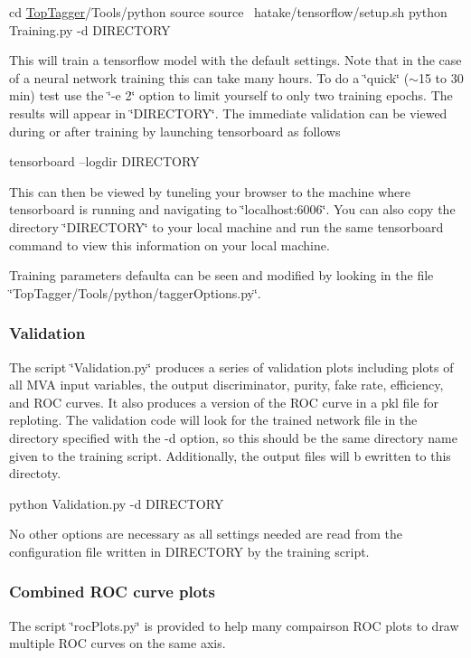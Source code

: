 \begin{DoxyCode}
cd \hyperlink{classTopTagger}{TopTagger}/Tools/python
source source ~hatake/tensorflow/setup.sh
python Training.py -d DIRECTORY
\end{DoxyCode}


This will train a tensorflow model with the default settings. Note that in the case of a neural network training this can take many hours. To do a \char`\"{}quick\char`\"{} ($\sim$15 to 30 min) test use the \char`\"{}-\/e 2\char`\"{} option to limit yourself to only two training epochs. The results will appear in \char`\"{}\-D\-I\-R\-E\-C\-T\-O\-R\-Y\char`\"{}. The immediate validation can be viewed during or after training by launching tensorboard as follows


\begin{DoxyCode}
tensorboard --logdir DIRECTORY
\end{DoxyCode}


This can then be viewed by tuneling your browser to the machine where tensorboard is running and navigating to \char`\"{}localhost\-:6006\char`\"{}. You can also copy the directory \char`\"{}\-D\-I\-R\-E\-C\-T\-O\-R\-Y\char`\"{} to your local machine and run the same tensorboard command to view this information on your local machine.

Training parameters defaulta can be seen and modified by looking in the file \char`\"{}\-Top\-Tagger/\-Tools/python/tagger\-Options.\-py\char`\"{}.

\subsubsection*{Validation}

The script \char`\"{}\-Validation.\-py\char`\"{} produces a series of validation plots including plots of all M\-V\-A input variables, the output discriminator, purity, fake rate, efficiency, and R\-O\-C curves. It also produces a version of the R\-O\-C curve in a pkl file for reploting. The validation code will look for the trained network file in the directory specified with the -\/d option, so this should be the same directory name given to the training script. Additionally, the output files will b ewritten to this directoty.


\begin{DoxyCode}
python Validation.py -d DIRECTORY
\end{DoxyCode}


No other options are necessary as all settings needed are read from the configuration file written in D\-I\-R\-E\-C\-T\-O\-R\-Y by the training script.

\subsubsection*{Combined R\-O\-C curve plots}

The script \char`\"{}roc\-Plots.\-py\char`\"{} is provided to help many compairson R\-O\-C plots to draw multiple R\-O\-C curves on the same axis. 